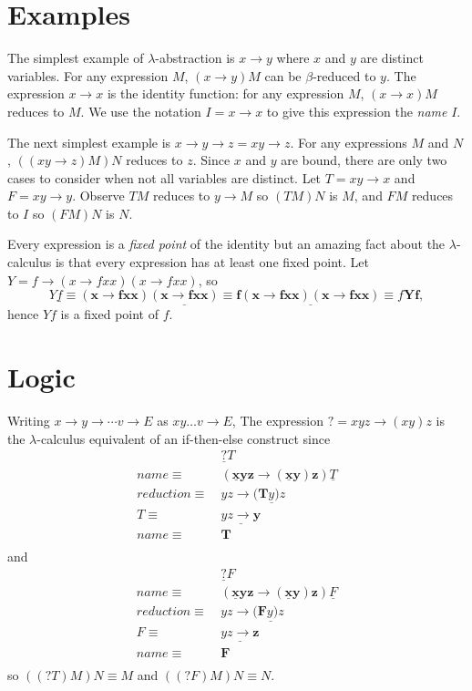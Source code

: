 \documentclass[11pt,letterpaper,fleqn]{report}
\newcommand{\reason}[1]{{#1}\equiv\ }
\begin{document}
\section{Examples}
The simplest example of \(\lambda\)-abstraction is \(x\to y\) where \(x\)
and \(y\) are distinct variables.
For any expression \(M\), \((x\to y)M\) can be \(\beta\)-reduced to \(y\).
The expression \(x\to x\) is the identity function: for any
expression \(M\), \((x\to x)M\) reduces to \(M\). We use the notation
\(I = x\to x\) to give this expression the {\em name} \(I\).

The next simplest example is \(x\to y\to z = xy\to z\). For any
expressions \(M\) and \(N\), \(((x y\to z)M)N\) reduces to \(z\).
Since \(x\) and \(y\) are bound, there are only two cases to consider
when not all variables are distinct.
Let \(T = x y\to x\) and \(F = x y\to y\).
Observe \(TM\) reduces to \(y\to M\) so \((TM)N\) is \(M\),
and \(FM\) reduces to \(I\) so \((FM)N\) is \(N\).

Every expression is a {\em fixed point} of the identity but an amazing
fact about the \(\lambda\)-calculus is that every expression has at
least one fixed point.  Let \(Y = f \to(x\to fxx)(x\to fxx)\), so
\[
Y\underline{f}\equiv \bm{(x\to fxx)\underline{(x\to fxx)}}\equiv
\bm{f\underline{(x\to fxx)(x\to fxx)}}\equiv f\bm{Yf},
\]
hence \(Yf\) is a fixed point of \(f\).

\section{Logic}

Writing \(x\to y\to \cdots v\to E\) as \(xy\dots v\to E\),
The expression \(? = xyz\to (x y) z\) is the \(\lambda\)-calculus
equivalent of an if-then-else construct since
\begin{align*}
&\underline{?}T\\
\reason{name}&\bm{(\underline{x}yz\to (\underline{x} y) z)}\underline{T}\\
\reason{reduction}&yz\to (\underline{\bm{T} y) z}\\
\reason{T}&\underline{yz\to \bm{y}}\\
\reason{name}&\bm{T}\\
\end{align*}
and
\begin{align*}
&\underline{?}F\\
\reason{name}&\bm{(\underline{x}yz\to (\underline{x} y) z)}\underline{F}\\
\reason{reduction}&yz\to (\underline{\bm{F} y) z}\\
\reason{F}&\underline{yz\to \bm{z}}\\
\reason{name}&\bm{F}\\
\end{align*}
so \(((?T)M)N\equiv M\) and \(((?F)M)N\equiv N\). 
\end{document}
